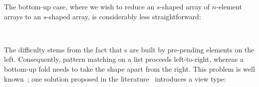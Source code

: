 The bottom-up case, where we wish to reduce an $s$-shaped array of $n$-element
arrays to an $s$-shaped array, is considerably less straightforward:
\begin{code}%
%
\>[2]%
\>[13]\AgdaSymbol{:}\AgdaSpace{}%
\AgdaSpace{}%
\AgdaSymbol{\{}\AgdaSpace{}%
\AgdaSymbol{\}}\AgdaSpace{}%
\AgdaSpace{}%
\AgdaSpace{}%
\AgdaSymbol{(}\AgdaSpace{}%
\AgdaOperator{\AgdaFunction{++}}\AgdaSpace{}%
\AgdaOperator{\AgdaFunction{[}}\AgdaSpace{}%
\AgdaSpace{}%
\AgdaOperator{\AgdaFunction{]}}\AgdaSymbol{)}\AgdaSpace{}%
\AgdaSpace{}%
\AgdaSpace{}%
\AgdaSpace{}%
\AgdaSpace{}%
\AgdaSymbol{)}\AgdaSpace{}%
\AgdaSpace{}%
\AgdaSymbol{(}\AgdaSpace{}%
\AgdaInductiveConstructor{[]}\AgdaSpace{}%
\AgdaSpace{}%
\AgdaSpace{}%
\AgdaSymbol{)}\<%
\\
%
\>[13]\AgdaSpace{}%
\AgdaSpace{}%
\AgdaSpace{}%
\AgdaSpace{}%
\AgdaSpace{}%
\AgdaSpace{}%
\AgdaSpace{}%
\AgdaSpace{}%
\<%
\end{code}
The difficulty stems from the fact that s are built by pre-pending
elements on the left. Consequently, pattern matching on a list proceeds
left-to-right, whereas a bottom-up fold needs to take the shape apart from the
right. This problem is well known~\citep{SWIERSTRA_2022}; one solution
proposed in the literature~\citep{MCBRIDE_MCKINNA_2004} introduces a view type:
